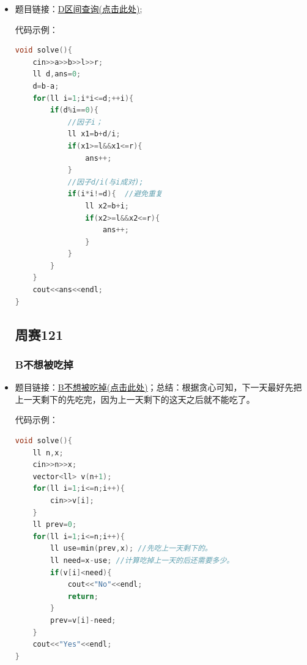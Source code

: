 \begin{itemize}
代码示例：\\
\begin{lstlisting}[language=C++]
#include <bits/stdc++.h>
using namespace std;
using ll = long long;

int main() {
	ios::sync_with_stdio(false);
	cin.tie(nullptr);
	
	int T;
	if (!(cin >> T)) return 0;
	while (T--) {
		int n;
		cin >> n;
		vector<ll> a(n);
		for (int i = 0; i < n; ++i) cin >> a[i];
		sort(a.begin(), a.end(), greater<ll>()); // 降序排列
		for (int i = 0; i < n; ++i) {
			if (i) cout << ' ';
			cout << a[i];
		}
		cout << '\n';
	}
	return 0;
}

\end{lstlisting}
\subsubsection{D区间查询\textcolor{red}{(求因数模板)}}
\item 题目链接：\href{https://ac.nowcoder.com/acm/contest/123787/D}{D区间查询(点击此处)};

代码示例：\\
\begin{lstlisting}[language=C++]
void solve(){
	cin>>a>>b>>l>>r;
	ll d,ans=0;
	d=b-a;
	for(ll i=1;i*i<=d;++i){
		if(d%i==0){
			//因子i；
			ll x1=b+d/i;
			if(x1>=l&&x1<=r){
				ans++;
			}
			//因子d/i(与i成对);
			if(i*i!=d){  //避免重复
				ll x2=b+i;
				if(x2>=l&&x2<=r){
					ans++;
				}
			}
		}
	}
	cout<<ans<<endl;
}
\end{lstlisting}
\subsection{周赛121}
\subsubsection{B不想被吃掉}
\item 题目链接：\href{https://ac.nowcoder.com/acm/contest/124143/B}{B不想被吃掉(点击此处)}；总结：根据贪心可知，下一天最好先把上一天剩下的先吃完，因为上一天剩下的这天之后就不能吃了。

代码示例：\\
\begin{lstlisting}[language=C++]
void solve(){
	ll n,x;
	cin>>n>>x;
	vector<ll> v(n+1);
	for(ll i=1;i<=n;i++){
		cin>>v[i];
	}
	ll prev=0;
	for(ll i=1;i<=n;i++){
		ll use=min(prev,x); //先吃上一天剩下的。
		ll need=x-use; //计算吃掉上一天的后还需要多少。
		if(v[i]<need){
			cout<<"No"<<endl;
			return;
		}
		prev=v[i]-need;
	}
	cout<<"Yes"<<endl;
}
\end{lstlisting}

\end{itemize}
